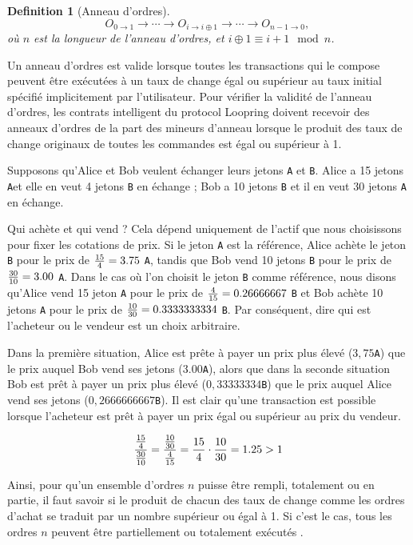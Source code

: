 \documentclass[UTF8,nofonts]{article}
\newtheorem{definition}{Definition}[section]
\begin{document}
\begin{multicols}{2}
\begin{definition}[Anneau d'ordres]
$$O_{0\rightarrow 1} \rightarrow \cdots \rightarrow O_{i\rightarrow i\oplus 1} \rightarrow \cdots \rightarrow O_{n-1\rightarrow 0} \text{, }$$
où $n$ est la longueur de l'anneau d'ordres, et $i\oplus 1 \equiv i+1 \mod n$.
\end{definition}

Un anneau d'ordres est valide lorsque toutes les transactions qui le compose peuvent être exécutées à un taux de change égal ou supérieur au taux initial spécifié implicitement par l'utilisateur. Pour vérifier la validité de l'anneau d’ordres, les contrats intelligent du protocol Loopring doivent recevoir des anneaux d’ordres de la part des mineurs d'anneau lorsque le produit des taux de change originaux de toutes les commandes est égal ou supérieur à 1.

Supposons qu'Alice et Bob veulent échanger leurs jetons \verb|A| et \verb|B|. Alice a  15 jetons \verb|A|et elle en veut 4 jetons \verb|B| en échange ; Bob a 10 jetons \verb|B| et il en veut 30 jetons \verb|A| en échange.

Qui achète et qui vend ? Cela dépend uniquement de l'actif que nous choisissons pour fixer les cotations de prix. Si le jeton \verb|A| est la référence, Alice achète le jeton \verb|B| pour le prix de ${15 \over 4 }= 3.75$ \verb|A|, tandis que Bob vend 10 jetons \verb|B| pour le prix de ${30 \over 10} = 3.00$ \verb|A|. Dans le cas où l’on choisit le jeton \verb|B| comme référence, nous disons qu'Alice vend 15 jeton \verb|A| pour le prix de ${4\over 15}=0.26666667$ \verb|B| et Bob achète 10 jetons \verb|A| pour le prix de ${10 \over 30}=0.3333333334$ \verb|B|. Par conséquent, dire qui est l'acheteur ou le vendeur est un choix arbitraire.

Dans la première situation, Alice est prête à payer un prix plus élevé ($3,75$\verb|A|) que le prix auquel Bob vend ses jetons (3$.00$\verb|A|), alors que dans la seconde situation Bob est prêt à payer un prix plus élevé ($0,33333334$\verb|B|) que le prix auquel Alice vend ses jetons ($0,2666666667$\verb|B|). Il est clair qu'une transaction est possible lorsque l'acheteur est prêt à payer un prix égal ou supérieur au prix du vendeur.

\begin{equation}
{{15\over 4} \over {30\over 10}} = {{10\over 30} \over {4\over 15}}={15 \over 4} \cdot {10 \over 30} = 1.25 > 1
\end{equation}

Ainsi, pour qu'un ensemble d'ordres $n$ puisse être rempli, totalement ou en partie, il faut savoir si le produit de chacun des taux de change comme les ordres d'achat se traduit par un nombre supérieur ou égal à 1. Si c'est le cas, tous les ordres $n$ peuvent être partiellement ou totalement exécutés \cite{supersymmetry}.


\end{multicols}
\end{document}
